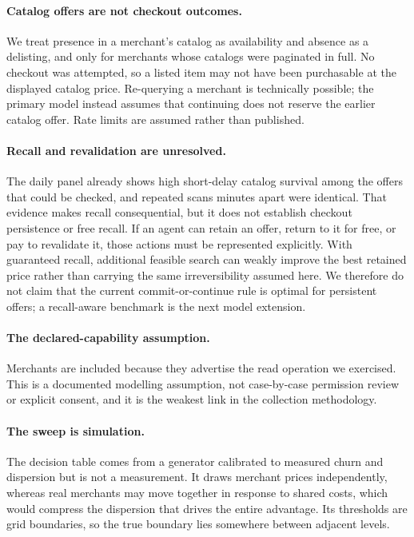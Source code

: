 \paragraph{Catalog offers are not checkout outcomes.}
We treat presence in a merchant's catalog as availability and absence as a delisting,
and only for merchants whose catalogs were paginated in full. No checkout was
attempted, so a listed item may not have been purchasable at the displayed catalog
price. Re-querying a merchant is technically possible; the primary model instead
assumes that continuing does not reserve the earlier catalog offer. Rate limits are
assumed rather than published.

\paragraph{Recall and revalidation are unresolved.}
The daily panel already shows high short-delay catalog survival among the offers that
could be checked, and repeated scans minutes apart were identical. That evidence makes
recall consequential, but it does not establish checkout persistence or free recall.
If an agent can retain an offer, return to it for free, or pay to revalidate it, those
actions must be represented explicitly. With guaranteed recall, additional feasible
search can weakly improve the best retained price rather than carrying the same
irreversibility assumed here. We therefore do not claim that the current
commit-or-continue rule is optimal for persistent offers; a recall-aware benchmark is
the next model extension.

\paragraph{The declared-capability assumption.}
Merchants are included because they advertise the read operation we exercised. This
is a documented modelling assumption, not case-by-case permission review or explicit
consent, and it is the weakest link in the collection methodology.

\paragraph{The sweep is simulation.}
The decision table comes from a generator calibrated to measured churn and dispersion
but is not a measurement. It draws merchant prices independently, whereas real
merchants may move together in response to shared costs, which would compress the
dispersion that drives the entire advantage. Its thresholds are grid boundaries, so
the true boundary lies somewhere between adjacent levels.


